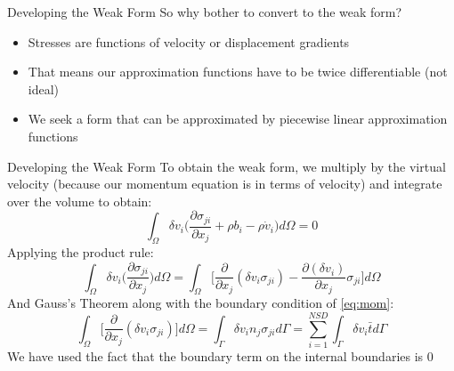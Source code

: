 \documentclass{beamer}
\begin{document}
\begin{frame}{Developing the Weak Form}
	So why bother to convert to the weak form?
	\begin{itemize}
		\item Stresses are functions of velocity or displacement gradients
		\item That means our approximation functions have to be twice differentiable (not ideal)
		\item We seek a form that can be approximated by piecewise linear approximation functions
	\end{itemize}
\end{frame}
\begin{frame}{Developing the Weak Form}
	To obtain the weak form, we multiply by the virtual velocity (because our momentum equation is 
	in terms of velocity) and integrate over the volume to obtain:
	\begin{equation}
		\int_{\Omega}\delta v_{i}\bigg(\frac{\partial \sigma_{ji}}{\partial x_{j}}+\rho b_{i}-\rho\dot{v}_{i}\bigg)d\Omega=0
		\label{eq:virtv}
	\end{equation}
	Applying the product rule:
	\begin{equation}
		\int_{\Omega}\delta v_{i}\bigg(\frac{\partial \sigma_{ji}}{\partial x_{j}}\bigg)d\Omega=
		\int_{\Omega}\bigg[\frac{\partial}{\partial x_{j}}(\delta v_{i} \sigma_{ji})-
		\frac{\partial (\delta v_{i})}{\partial x_{j}}\sigma_{ji}\bigg]d\Omega
		\label{eq:prod}
	\end{equation}
	And Gauss's Theorem along with the boundary condition of \ref{eq:mom}:
	\begin{equation}
		\int_{\Omega}\bigg[\frac{\partial}{\partial x_{j}}(\delta v_{i} \sigma_{ji})\bigg]d\Omega=
		\int_{\Gamma}\delta v_{i} n_{j}\sigma_{ji}d\Gamma=
		\sum_{i=1}^{NSD}\int_{\Gamma}\delta v_{i}\bar{t}d\Gamma
		\label{eq:gauss}
	\end{equation}
	We have used the fact that the boundary term on the internal boundaries is 0
\end{frame}
\end{document}
